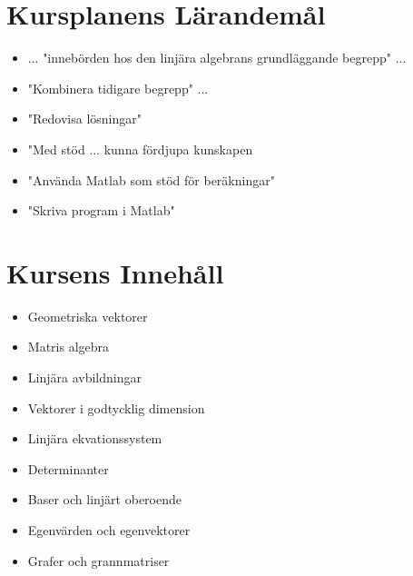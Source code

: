         \section{Kursplanens Lärandemål}
        \begin{itemize}
            \item ... "innebörden hos den linjära algebrans grundläggande begrepp" ...
            \item "Kombinera tidigare begrepp" ...
            \item "Redovisa lösningar"
            \item "Med stöd ... kunna fördjupa kunskapen
            \item "Använda Matlab som stöd för beräkningar"
            \item "Skriva program i Matlab"
        \end{itemize}

        \section{Kursens Innehåll}
        \begin{itemize}
            \item Geometriska vektorer
            \item Matris algebra
            \item Linjära avbildningar
            \item Vektorer i godtycklig dimension
            \item Linjära ekvationssystem
            \item Determinanter
            \item Baser och linjärt oberoende
            \item Egenvärden och egenvektorer
            \item Grafer och grannmatriser
        \end{itemize}

